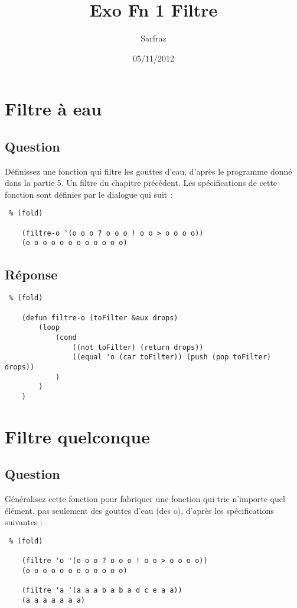 \documentclass[a4paper, 11pt]{article}
\title{Exo Fn 1 Filtre}
\author{Sarfraz \bsc{kapasi}}
\date{05/11/2012}
\begin{document}
%
\maketitle
%
\section{Filtre à eau} %
\label{sec:Filtre à eau}

\subsection{Question} %
\label{sub:Question}
Définissez une fonction qui filtre les gouttes d'eau, d'après le programme donné dans la partie 5. Un filtre du chapitre précédent. Les spécifications de cette fonction sont définies par le dialogue qui suit :
\begin{lstlisting} % (fold)

    (filtre-o '(o o o ? o o o ! o o > o o o o))
    (o o o o o o o o o o o o)
\end{lstlisting}
\subsection{Réponse} %
\label{sub:Réponse}
\begin{lstlisting} % (fold)

    (defun filtre-o (toFilter &aux drops)
        (loop
            (cond
                ((not toFilter) (return drops))
                ((equal 'o (car toFilter)) (push (pop toFilter) drops))
            )
        )
    )
\end{lstlisting}


\section{Filtre quelconque} %
\label{sec:Filtre quelconque}

\subsection{Question} %
\label{sub:Question}
Généralisez cette fonction pour fabriquer une fonction qui trie n'importe quel élément, pas seulement des gouttes d'eau (des o), d'après les spécifications suivantes :

\begin{lstlisting} % (fold)

    (filtre 'o '(o o o ? o o o ! o o > o o o o))
    (o o o o o o o o o o o o)

    (filtre 'a '(a a a b a b a d c e a a))
    (a a a a a a a)
\end{lstlisting}
\end{document}
